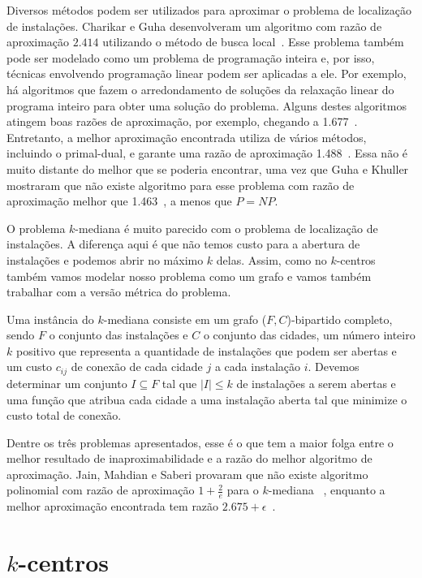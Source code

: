 \documentclass[12pt]{article}
\newcommand{\NP}{\mathit{NP}}
\begin{document}
Diversos métodos podem ser utilizados para aproximar o problema de localização de instalações. Charikar e Guha desenvolveram um algoritmo com razão de aproximação $2.414$ utilizando o método de busca local~\cite{Charikar&Guha'05}.  Esse problema também pode ser modelado como um problema de programação inteira e, por isso, técnicas envolvendo programação linear podem ser aplicadas a ele.  Por exemplo, há algoritmos que fazem o arredondamento de soluções da relaxação linear do programa inteiro para obter uma solução do problema.  Alguns destes algoritmos atingem boas razões de aproximação, por exemplo, chegando a 1.677~\cite{Byrka&Aardal'10}. Entretanto, a melhor aproximação encontrada utiliza de vários métodos, incluindo o primal-dual, e garante uma razão de aproximação 1.488~\cite{LI'13}. Essa não é muito distante do melhor que se poderia encontrar, uma vez que Guha e Khuller mostraram que não existe algoritmo para esse problema com razão de aproximação melhor que 1.463~\cite{GUHA1999228}, a menos que $P = \NP$.

O problema $k$-mediana é muito parecido com o problema de localização de instalações. A diferença aqui é que não temos custo para a abertura de instalações e podemos abrir no máximo $k$ delas. Assim, como no $k$-centros também vamos modelar nosso problema como um grafo e vamos também trabalhar com a versão métrica do problema.

Uma instância do $k$-mediana consiste em um grafo ($F,C$)-bipartido completo, sendo $F$ o conjunto das instalações e $C$ o conjunto das cidades, um número inteiro $k$ positivo que representa a quantidade de instalações que podem ser abertas e um custo $c_{ij}$ de conexão de cada cidade $j$ a cada instalação $i$. Devemos determinar um conjunto $I \subseteq F$ tal que $|I| \leq k$ de instalações a serem abertas e uma função que atribua cada cidade a uma instalação aberta tal que minimize o custo total de conexão.

Dentre os três problemas apresentados, esse é o que tem a maior folga entre o melhor resultado de inaproximabilidade e a razão do melhor algoritmo de aproximação. Jain, Mahdian e Saberi provaram que não existe algoritmo polinomial com razão de aproximação $1+ \frac{2}{e}$ para o $k$-mediana ~\cite{JMS'02}, enquanto a melhor aproximação encontrada tem razão $2.675 + \epsilon$~\cite{BPRST'17}.

\newpage
\section{$k$-centros}
\end{document}
